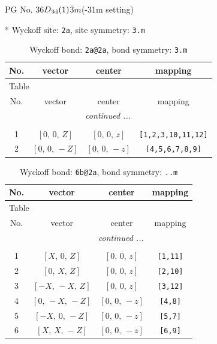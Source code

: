 \documentclass[fleqn,8pt]{jsarticle}
\begin{document}
\setcounter{MaxMatrixCols}{32}

\renewcommand{\tablename}{Table~}
\renewcommand{\figurename}{Figure~}
\begin{center}
\LARGE
PG No. 36\quad$D_{\rm 3d}(1)$\quad$\bar{3}m$\quad(-31m setting)\quad[ trigonal ]
\end{center}


* Wyckoff site: {\tt 2a}, site symmetry: {\tt 3.m}
\renewcommand{\arraystretch}{1.2}
\begin{longtable}{cccc}
\caption{Wyckoff bond: {\tt 2a@2a}, bond symmetry: {\tt 3.m}}
 \\
 \hline \hline
No. & vector & center & mapping \\ \hline \endfirsthead

\multicolumn{3}{l}{\tablename\ \thetable{}} \\
 \hline \hline
No. & vector & center & mapping \\ \hline \endhead

 \hline \hline
\multicolumn{3}{r}{\footnotesize\it continued ...} \\ \endfoot

 \hline \hline
\multicolumn{3}{r}{} \\ \endlastfoot

1 & $\left[ 0,\, 0,\, Z \right]$ & $\left[ 0,\, 0,\, z \right]$ & {\tt [1,2,3,10,11,12]} \\ \hline
2 & $\left[ 0,\, 0,\, - Z \right]$ & $\left[ 0,\, 0,\, - z \right]$ & {\tt [4,5,6,7,8,9]} \\
\end{longtable}
\renewcommand{\arraystretch}{1.2}
\begin{longtable}{cccc}
\caption{Wyckoff bond: {\tt 6b@2a}, bond symmetry: {\tt ..m}}
 \\
 \hline \hline
No. & vector & center & mapping \\ \hline \endfirsthead

\multicolumn{3}{l}{\tablename\ \thetable{}} \\
 \hline \hline
No. & vector & center & mapping \\ \hline \endhead

 \hline \hline
\multicolumn{3}{r}{\footnotesize\it continued ...} \\ \endfoot

 \hline \hline
\multicolumn{3}{r}{} \\ \endlastfoot

1 & $\left[ X,\, 0,\, Z \right]$ & $\left[ 0,\, 0,\, z \right]$ & {\tt [1,11]} \\ \hline
2 & $\left[ 0,\, X,\, Z \right]$ & $\left[ 0,\, 0,\, z \right]$ & {\tt [2,10]} \\ \hline
3 & $\left[ - X,\, - X,\, Z \right]$ & $\left[ 0,\, 0,\, z \right]$ & {\tt [3,12]} \\ \hline
4 & $\left[ 0,\, - X,\, - Z \right]$ & $\left[ 0,\, 0,\, - z \right]$ & {\tt [4,8]} \\ \hline
5 & $\left[ - X,\, 0,\, - Z \right]$ & $\left[ 0,\, 0,\, - z \right]$ & {\tt [5,7]} \\ \hline
6 & $\left[ X,\, X,\, - Z \right]$ & $\left[ 0,\, 0,\, - z \right]$ & {\tt [6,9]} \\
\end{longtable}
\end{document}
